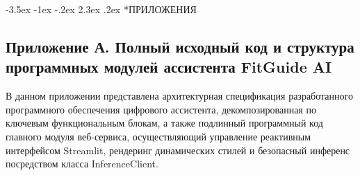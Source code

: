 \documentclass[14pt, a4paper]{extarticle}
\makeatletter
\renewcommand\section{\@startsection {section}{1}{\z@}%
                                   {-3.5ex \@plus -1ex \@minus -.2ex}%
                                   {2.3ex \@plus.2ex}%
                                   {\centering\normalfont\Large\bfseries}}
\makeatother
\begin{document}
\newpage
\section*{ПРИЛОЖЕНИЯ}

\subsection*{Приложение А. Полный исходный код и структура программных модулей ассистента FitGuide AI}

В данном приложении представлена архитектурная спецификация разработанного программного обеспечения цифрового ассистента, декомпозированная по ключевым функциональным блокам, а также подлинный программный код главного модуля веб-сервиса, осуществляющий управление реактивным интерфейсом Streamlit, рендеринг динамических стилей и безопасный инференс посредством класса InferenceClient.
\end{document}

